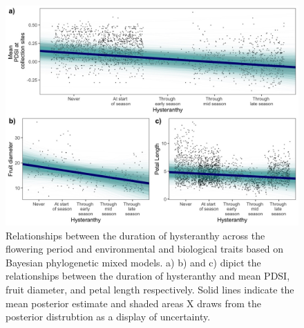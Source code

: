 \documentclass{article}[11pt]
\begin{document}
{\begin{figure}[h!]
    \centering
 \includegraphics[width=\textwidth]{..//..//Plots/dataplots.jpeg}
    \caption{Relationships between the duration of hysteranthy across the flowering period and environmental and biological traits based on Bayesian phylogenetic mixed models. a) b) and c) dipict the relationships between the duration of hysteranthy and mean PDSI, fruit diameter, and petal length respectively. Solid lines indicate the mean posterior estimate and shaded areas X draws from the posterior distrubtion as a display of uncertainty. }
    \label{fig:prunes}
\end{figure}


}
\end{document}
